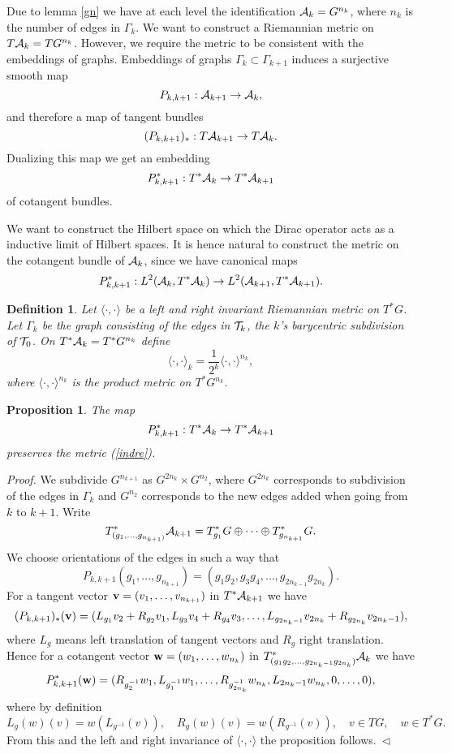 \documentclass[12pt]{article}
\newcommand{\eproof}{{~\hfill$ \triangleleft$}}
\def\ca{{\cal A}}
\def\ct{{\cal T}}
\newtheorem{definition}[thm]{Definition}
\newtheorem{proposition}[thm]{Proposition}
\begin{document}
{Due to lemma \ref{gn} we have at each level the identification $\ca_k=G^{n_k}$, where $n_k$ is the number of edges in $\Gamma_k$. We want to construct a Riemannian metric on $T\ca_k =TG^{n_k}$. However, we require the metric to be consistent with the embeddings of graphs. Embeddings of graphs $\Gamma_k\subset \Gamma_{k+1}$ induces a surjective smooth map 
$$P_{k,k+1}: \ca_{k+1} \to \ca_{k},$$ 
and therefore a map of tangent bundles
$$(P_{k,k+1})_*:T\ca_{k+1}\to T\ca_{k}.$$
Dualizing this map we get an embedding
$$P_{k,k+1}^* :T^*\ca_{k} \to T^*\ca_{k+1}$$
of cotangent bundles. 

We want to construct the Hilbert space on which the Dirac operator acts as a inductive limit of Hilbert spaces. It is hence natural to construct the metric on the cotangent bundle of $\ca_k$, since we have canonical maps 
$$P_{k,k+1}^*:L^2(\ca_{k},T^*\ca_{k})\to L^2(\ca_{k+1},T^*\ca_{k+1}).$$

\begin{definition}
Let $\langle \cdot,\cdot \rangle$ be a left and right invariant Riemannian metric on $T^*G$. Let $\Gamma_k$ be the graph consisting of the edges in $\ct_k$, the $k$'s barycentric subdivision of $\ct_0$. On $T^*\ca_{k}=T^*G^{n_{k}}$ define
\begin{equation} \label{indre}
\langle \cdot ,\cdot \rangle_{k}=\frac{1}{2^k} \langle \cdot ,\cdot \rangle^{n_{k}},
\end{equation}
where  $\langle \cdot ,\cdot \rangle^{n_{k}}$ is the product metric on $T^*G^{n_{k}}$. 
\end{definition}

\begin{proposition}\label{komind}
The map 
$$P_{k, k+1}^*:T^*\ca_{k}\to T^*\ca_{k+1}$$
preserves the metric (\ref{indre}).
\end{proposition}

\textit{Proof.} We subdivide $G^{n_{{k+1}}}$ as $G^{2n_{k}}\times G^{n_2}$, where $G^{2n_{k}}$ corresponds to subdivision of the edges in $\Gamma_k$ and $G^{n_2}$ corresponds to the new edges added when going from $k$ to $k+1$. Write 
$$T^*_{(g_1,\ldots, g_{n_{k+1})}}\ca_{k+1}=T^*_{g_1}G\oplus \cdots \oplus T^*_{g_{n_{k+1}}}G.$$
We choose orientations of the edges in such a way that 
$$P_{k,k+1}(g_1,\ldots, g_{n_{k+1}})=(g_1g_2,g_3g_4,\ldots ,g_{2n_{k-1}}g_{2n_{k}}).$$
For a tangent vector ${\bf{v}}=(v_1,\ldots,v_{n_{k+1}})$ in $T^*\ca_{k+1}$ we have
$$(P_{k,k+1})_*({\bf{v}})=(L_{g_1}v_2+R_{g_2}v_1,L_{g_3}v_4+R_{g_4}v_3,\ldots ,L_{g_{2n_{k}-1}}v_{2n_{k}}+R_{g_{2n_{k}}}v_{2n_{k}-1}), $$
where $L_g$ means left translation of tangent vectors and $R_g$ right translation. Hence for a cotangent vector ${\bf{w}}=(w_1,\ldots, w_{n_{k}})$ in $T^*_{(g_1g_2, \ldots,g_{2n_{k}-1}g_{2n_{k}})}\ca_{k}$ we have
$$P^*_{k,k+1}({\bf{w}})=(R_{g_2^{-1}}w_1,L_{g_1^{-1}}w_1,\ldots,R_{g_{2n_{k}}^{-1}}w_{n_{k}},L_{2n_{k}-1}w_{n_{k}},0,\ldots,0),$$
where by definition 
$$L_g(w)(v)=w(L_{g^{-1}}(v)),\quad R_g(w)(v)=w(R_{g^{-1}}(v)), \quad v\in TG,\quad w\in T^*G.$$
From this and the left and right invariance of $\langle \cdot ,\cdot \rangle$ the proposition follows.\eproof \\

}
\end{document}
